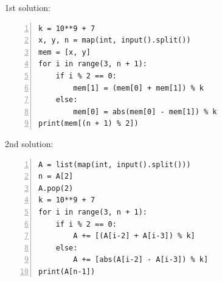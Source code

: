 \documentclass{article}
\begin{document}
\begin{multicols}{2}
1st solution:
\begin{Verbatim}[numbers=left,xleftmargin=5mm]
k = 10**9 + 7
x, y, n = map(int, input().split())
mem = [x, y]
for i in range(3, n + 1):
    if i % 2 == 0:
        mem[1] = (mem[0] + mem[1]) % k
    else:
        mem[0] = abs(mem[0] - mem[1]) % k
print(mem[(n + 1) % 2])
\end{Verbatim}
\columnbreak
2nd solution:
\begin{Verbatim}[numbers=left,xleftmargin=5mm]
A = list(map(int, input().split()))
n = A[2]
A.pop(2)
k = 10**9 + 7
for i in range(3, n + 1):
    if i % 2 == 0:
        A += [(A[i-2] + A[i-3]) % k]
    else:
        A += [abs(A[i-2] - A[i-3]) % k]
print(A[n-1])
\end{Verbatim}
\end{multicols}
\end{document}

